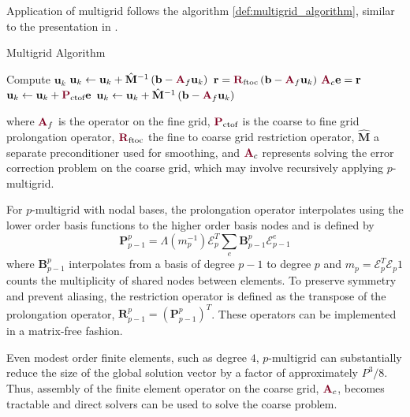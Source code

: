Application of multigrid follows the algorithm \ref{def:multigrid_algorithm}, similar to the presentation in \cite{brandt1982guide}.
\begin{definition}Multigrid Algorithm \label{def:multigrid_algorithm}
\begin{algorithmic}[1]
\State Compute $\mathbf{u}_k$
\State $\mathbf{u}_k \gets \mathbf{u}_k + \hat{\mathbf{M}}^{-1} \left( \mathbf{b} - {\color{burgundy}\mathbf{A}}_f \mathbf{u}_k \right)$ 
\State $\mathbf{r} = {\color{burgundy}\mathbf{R}}_{\text{ftoc}} \left( \mathbf{b} - {\color{burgundy}\mathbf{A}}_f \mathbf{u}_k \right)$ 
\State ${\color{burgundy}\mathbf{A}}_c \mathbf{e} = \mathbf{r}$                                                                          
\State $\mathbf{u}_k \gets \mathbf{u}_k + {\color{burgundy}\mathbf{P}}_{\text{ctof}} \mathbf{e}$                                         
\State $\mathbf{u}_k \gets \mathbf{u}_k + \hat{\mathbf{M}}^{-1} \left( \mathbf{b} - {\color{burgundy}\mathbf{A}}_f \mathbf{u}_k \right)$ 
\end{algorithmic}
\end{definition}
where ${\color{burgundy}\mathbf{A}}_f$ is the operator on the fine grid, ${\color{burgundy}\mathbf{P}}_{\text{ctof}}$ is the coarse to fine grid prolongation operator, ${\color{burgundy}\mathbf{R}}_{\text{ftoc}}$ the fine to coarse grid restriction operator, $\hat{\mathbf{M}}$ a separate preconditioner used for smoothing, and ${\color{burgundy}\mathbf{A}}_c$ represents solving the error correction problem on the coarse grid, which may involve recursively applying $p$-multigrid.

For $p$-multigrid with nodal bases, the prolongation operator interpolates using the lower order basis functions to the higher order basis nodes and is defined by
\begin{equation}
\mathbf{P}_{p - 1}^p = \Lambda \left( m_p^{-1} \right) \mathcal{E}_p^T \sum_e \mathbf{B}_{p - 1}^p \mathcal{E}^e_{p - 1}
\label{mg_prolong}
\end{equation}
where $\mathbf{B}_{p - 1}^p$ interpolates from a basis of degree $p - 1$ to degree $p$ and $m_p = \mathcal{E}_p^T \mathcal{E}_p 1$ counts the multiplicity of shared nodes between elements.
To preserve symmetry and prevent aliasing, the restriction operator is defined as the transpose of the prolongation operator, $\mathbf{R}_{p - 1}^p = \left( \mathbf{P}_{p - 1}^p \right)^T$.
These operators can be implemented in a matrix-free fashion.

Even modest order finite elements, such as degree $4$, $p$-multigrid can substantially reduce the size of the global solution vector by a factor of approximately $P^3 / 8$.
Thus, assembly of the finite element operator on the coarse grid, ${\color{burgundy}\mathbf{A}}_c$, becomes tractable and direct solvers can be used to solve the coarse problem.
